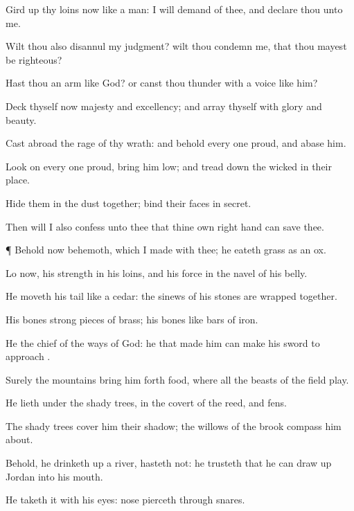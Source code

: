 {Gird
up thy
loins now like a
man: I will
demand of thee, and
declare thou unto me.

Wilt thou also
disannul my
judgment? wilt thou
condemn me, that thou mayest be
righteous?

Hast thou an
arm like
God? or canst thou
thunder with a
voice like him?

Deck thyself now
{}
majesty and
excellency; and
array thyself with
glory and
beauty.

Cast
abroad the
rage of thy
wrath: and
behold every one
{}
proud, and
abase him.

Look on every one
{}
proud,
{} bring him
low; and tread
down the
wicked in their place.

Hide them in the
dust
together;
{}
bind their
faces in
secret.

Then will I also
confess unto thee that thine own right
hand can
save thee.


\par }{\PP {}¶ Behold now
behemoth, which I
made with thee; he
eateth
grass as an
ox.

Lo now, his
strength
{} in his
loins, and his
force
{} in the
navel of his
belly.

He
moveth his
tail like a
cedar: the
sinews of his
stones are wrapped
together.

His
bones
{}
strong pieces of
brass; his
bones
{} like
bars of
iron.

He
{} the
chief of the
ways of
God: he that
made him can
make his
sword to
approach
{}.

Surely the
mountains bring him
forth
food, where all the
beasts of the
field
play.

He
lieth under the shady
trees, in the
covert of the
reed, and
fens.

The shady
trees
cover him
{} their
shadow; the
willows of the
brook compass him
about.

Behold, he drinketh
up a
river,
{}
hasteth not: he
trusteth that he can draw
up
Jordan into his
mouth.

He
taketh it with his
eyes:
{}
nose pierceth
through
snares.




}
